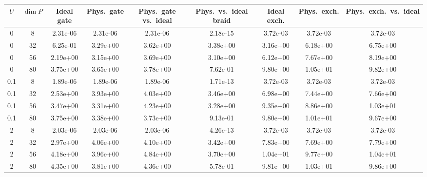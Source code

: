\begin{tabular}{ccccccccc}
\hline
$U$ & $\dim P$ & Ideal gate & Phys.\ gate & Phys.\ gate vs.\ ideal & Phys.\ vs.\ ideal braid & Ideal exch. & Phys.\ exch. & Phys.\ exch.\ vs.\ ideal \\
\hline
0 & 8 & 2.31e-06 & 2.31e-06 & 2.31e-06 & 2.18e-15 & 3.72e-03 & 3.72e-03 & 3.72e-03 \\
0 & 32 & 6.25e-01 & 3.29e+00 & 3.62e+00 & 3.38e+00 & 3.16e+00 & 6.18e+00 & 6.75e+00 \\
0 & 56 & 2.19e+00 & 3.15e+00 & 3.69e+00 & 3.10e+00 & 6.12e+00 & 7.67e+00 & 8.19e+00 \\
0 & 80 & 3.75e+00 & 3.65e+00 & 3.78e+00 & 7.62e-01 & 9.80e+00 & 1.05e+01 & 9.82e+00 \\
\hline
0.1 & 8 & 1.89e-06 & 1.89e-06 & 1.89e-06 & 1.71e-13 & 3.72e-03 & 3.72e-03 & 3.72e-03 \\
0.1 & 32 & 2.53e+00 & 3.93e+00 & 4.03e+00 & 3.46e+00 & 6.98e+00 & 7.44e+00 & 7.66e+00 \\
0.1 & 56 & 3.47e+00 & 3.31e+00 & 4.23e+00 & 3.28e+00 & 9.35e+00 & 8.86e+00 & 1.03e+01 \\
0.1 & 80 & 3.75e+00 & 3.38e+00 & 3.73e+00 & 9.13e-01 & 9.80e+00 & 1.01e+01 & 9.67e+00 \\
\hline
2 & 8 & 2.03e-06 & 2.03e-06 & 2.03e-06 & 4.26e-13 & 3.72e-03 & 3.72e-03 & 3.72e-03 \\
2 & 32 & 2.97e+00 & 4.06e+00 & 4.10e+00 & 3.42e+00 & 7.83e+00 & 7.69e+00 & 7.79e+00 \\
2 & 56 & 4.18e+00 & 3.96e+00 & 4.84e+00 & 3.70e+00 & 1.04e+01 & 9.77e+00 & 1.04e+01 \\
2 & 80 & 4.35e+00 & 3.81e+00 & 4.36e+00 & 5.78e-01 & 9.81e+00 & 1.03e+01 & 9.86e+00 \\
\hline
\end{tabular}
